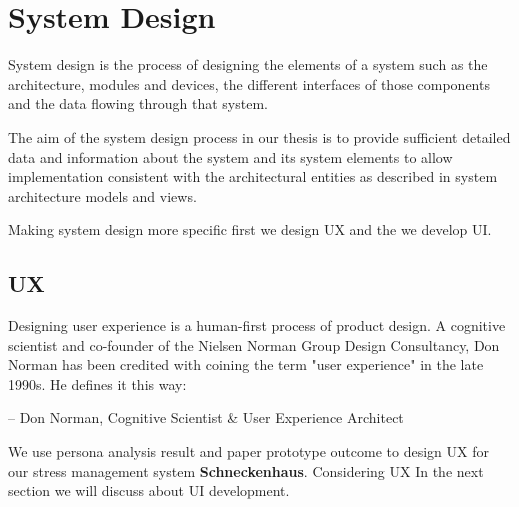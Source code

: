 \section{System Design}
System design is the process of designing the elements of a system such as the architecture, modules and devices, the different interfaces of those components and the data flowing through that system. 

The aim of the system design process in our thesis is to provide sufficient detailed data and information about the system and its system elements to allow implementation consistent with the architectural entities as described in system architecture models and views.

Making system design more specific first we design \acf{UX} and the we develop \acf{UI}.
\subsection{\acf{UX}}
Designing user experience is a human-first process of product design. A cognitive scientist and co-founder of the Nielsen Norman Group Design Consultancy, Don Norman has been credited with coining the term "user experience" in the late 1990s. He defines it this way:

– Don Norman, Cognitive Scientist \& User Experience Architect \citep{Norman1988TheThings}

We use persona analysis result and paper prototype outcome to design \acf{UX}  for our stress management system \textbf{Schneckenhaus}. Considering \acf{UX} In the next section we will discuss about \acf{UI} development.

